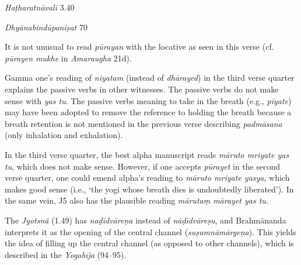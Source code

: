\begin{ekdosis}
\begin{testimonia}[hp01_049]
\emph{Haṭharatnāvalī} 3.40

\begin{versinnote}
\end{versinnote}

\emph{Dhyānabindūpaniṣat} 70

\begin{versinnote}
\end{versinnote}

\end{testimonia}

\begin{philcomm}[hp01_049]
It is not unusual to read \emph{pūrayan} with the locative as seen in this verse (cf. \emph{pūrayen mukhe} in \emph{Amaraugha} 21d). 

Gamma one's reading of \emph{niyatam} (instead of \emph{dhārayed}) in the third verse quarter explains the passive verbs in other witnesses. The passive verbs do not make sense with \emph{yas tu}. The passive verbs meaning to take in the breath (e.g., \emph{pīyate}) may have been adopted to remove the reference to holding the breath because a breath retention is not mentioned in the previous verse describing \emph{padmāsana} (only inhalation and exhalation). 

In the third verse quarter, the best alpha manuscript reads \emph{māruto mriyate yas tu}, which does not make sense. However, if one accepts \emph{pūrayet} in the second verse quarter, one could emend alpha's reading to \emph{māruto mriyate yasya}, which makes good sense (i.e., `the yogi whose breath dies is undoubtedly liberated'). In the same vein, J5 also has the plausible reading \emph{mārutaṃ mārayet yas tu}. 


The \emph{Jyotsnā} (1.49) has \emph{naḍīdvāreṇa} instead of \emph{nāḍīdvāreṣu}, and Brahmānanda interprets it as the opening of the central channel (\emph{suṣumnāmārgeṇa}). This yields the idea of filling up the central channel (as opposed to other channels), which is described in the \emph{Yogabīja} (94–95). 
\end{philcomm}


\end{ekdosis}
